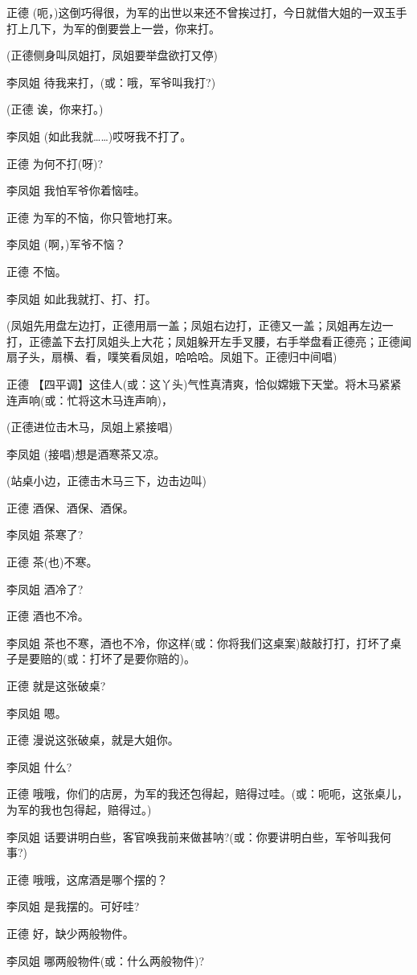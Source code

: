 正德
(呃，)这倒巧得很，为军的出世以来还不曾挨过打，今日就借大姐的一双玉手打上几下，为军的倒要尝上一尝，你来打。

(正德侧身叫凤姐打，凤姐要举盘欲打又停)

李凤姐 待我来打，(或：哦，军爷叫我打?)

(正德 诶，你来打。)

李凤姐 (如此我就\ldots{}\ldots{})哎呀我不打了。

正德 为何不打(呀)?

李凤姐 我怕军爷你着恼哇。

正德 为军的不恼，你只管地打来。

李凤姐 (啊，)军爷不恼？

正德 不恼。

李凤姐 如此我就打、打、打。

(凤姐先用盘左边打，正德用扇一盖；凤姐右边打，正德又一盖；凤姐再左边一打，正德盖下去打凤姐头上大花；凤姐躲开左手叉腰，右手举盘看正德亮；正德闻扇子头，扇横、看，噗笑看凤姐，哈哈哈。凤姐下。正德归中间唱)

正德
【四平调】这佳人(或：这丫头)气性真清爽，恰似嫦娥下天堂。将木马紧紧连声响(或：忙将这木马连声响)，

(正德进位击木马，凤姐上紧接唱)

李凤姐 (接唱)想是酒寒茶又凉。

(站桌小边，正德击木马三下，边击边叫)

正德 酒保、酒保、酒保。

李凤姐 茶寒了?

正德 茶(也)不寒。

李凤姐 酒冷了?

正德 酒也不冷。

李凤姐
茶也不寒，酒也不冷，你这样(或：你将我们这桌案)敲敲打打，打坏了桌子是要赔的(或：打坏了是要你赔的)。

正德 就是这张破桌?

李凤姐 嗯。

正德 漫说这张破桌，就是大姐你。

李凤姐 什么?

正德
哦哦，你们的店房，为军的我还包得起，赔得过哇。(或：呃呃，这张桌儿，为军的我也包得起，赔得过。)

李凤姐
话要讲明白些，客官唤我前来做甚呐?(或：你要讲明白些，军爷叫我何事?)

正德 哦哦，这席酒是哪个摆的？

李凤姐 是我摆的。可好哇?

正德 好，缺少两般物件。

李凤姐 哪两般物件(或：什么两般物件)?

